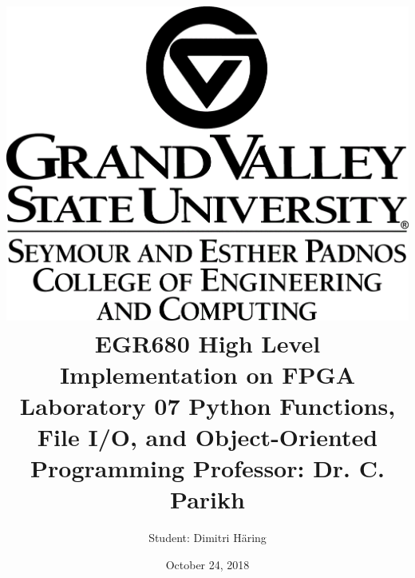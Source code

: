 \documentclass[]{article}
\title{ \includegraphics[scale=0.2]{01_images/gvsu_logo_marktop_SEPCEC_K_R.png}
		\linebreak 	\linebreak \linebreak
		EGR680 High Level Implementation on FPGA
		\linebreak \linebreak 
		Laboratory 07
		\linebreak \linebreak 
		Python Functions, File I/O, and	Object-Oriented Programming
		\linebreak \linebreak \linebreak
		Professor: Dr. C. Parikh
		}
\author{Student: Dimitri Häring } %
\date{October 24, 2018}
\begin{document}
\maketitle
\newpage

\tableofcontents
\pagebreak


%
 

\printbibliography
\end{document}
